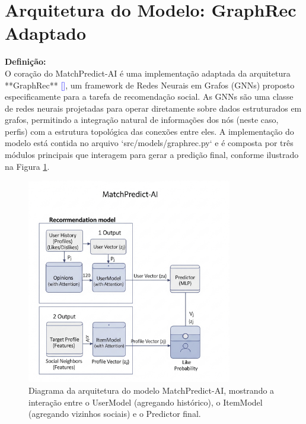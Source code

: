 \section{Arquitetura do Modelo: GraphRec Adaptado}
\label{sec:dev_arquitetura_modelo}

\textbf{Definição:} \\
O coração do MatchPredict-AI é uma implementação adaptada da arquitetura **GraphRec** \textcolor{blue}{[\cite{fan2019graphrec}]}, um framework de Redes Neurais em Grafos (GNNs) proposto especificamente para a tarefa de recomendação social. As GNNs são uma classe de redes neurais projetadas para operar diretamente sobre dados estruturados em grafos, permitindo a integração natural de informações dos nós (neste caso, perfis) com a estrutura topológica das conexões entre eles. A implementação do modelo está contida no arquivo `src/models/graphrec.py` e é composta por três módulos principais que interagem para gerar a predição final, conforme ilustrado na Figura \ref{fig:arquitetura_modelo_tcc2}.

\begin{figure}[H] %
    \centering
    \includegraphics[width=0.8\textwidth]{imagens/diagrama_arquitetura.png} %
    \caption{Diagrama da arquitetura do modelo MatchPredict-AI, mostrando a interação entre o UserModel (agregando histórico), o ItemModel (agregando vizinhos sociais) e o Predictor final.}
    \label{fig:arquitetura_modelo_tcc2}
\end{figure}

